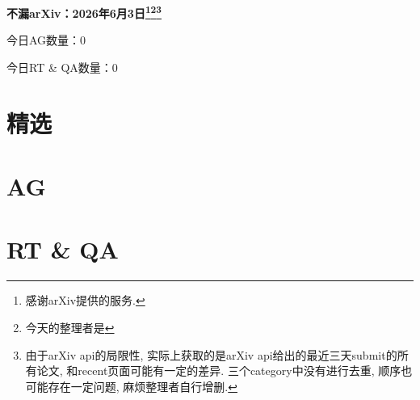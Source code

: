 \documentclass[9pt, a4paper]{article}
\theoremstyle{plain}
\theoremstyle{definition}
\theoremstyle{remark}
\newcommand{\AGnumber}{0}
\newcommand{\RTQAnumber}{0}
\newcommand{\NewestDate}{2026年6月3日}
\newcommand{\todayarXiver}{} %
\begin{document}
\begin{center}
    \Huge\textbf{不漏arXiv：\NewestDate\footnote{感谢arXiv提供的服务.}\footnote{今天的整理者是\todayarXiver}\footnote{由于arXiv api的局限性, 实际上获取的是arXiv api给出的最近三天submit的所有论文, 和recent页面可能有一定的差异. 三个category中没有进行去重, 顺序也可能存在一定问题, 麻烦整理者自行增删.}} \\
\end{center}

\setcounter{section}{-1}

\begin{center}
    今日AG数量：\AGnumber
    
    今日RT \& QA数量：\RTQAnumber
    
\end{center}


\section{精选}


\section{AG}

\section{RT \& QA}
\end{document}
